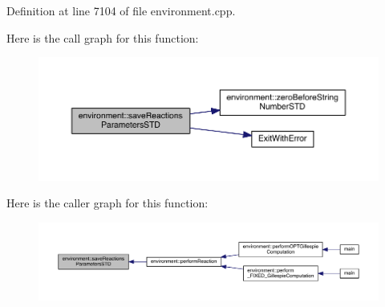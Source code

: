 Definition at line 7104 of file environment.\+cpp.



Here is the call graph for this function\+:\nopagebreak
\begin{figure}[H]
\begin{center}
\leavevmode
\includegraphics[width=350pt]{a00013_ad78fcf39a80e447a9aa2f84ab74335e5_cgraph}
\end{center}
\end{figure}




Here is the caller graph for this function\+:\nopagebreak
\begin{figure}[H]
\begin{center}
\leavevmode
\includegraphics[width=350pt]{a00013_ad78fcf39a80e447a9aa2f84ab74335e5_icgraph}
\end{center}
\end{figure}


